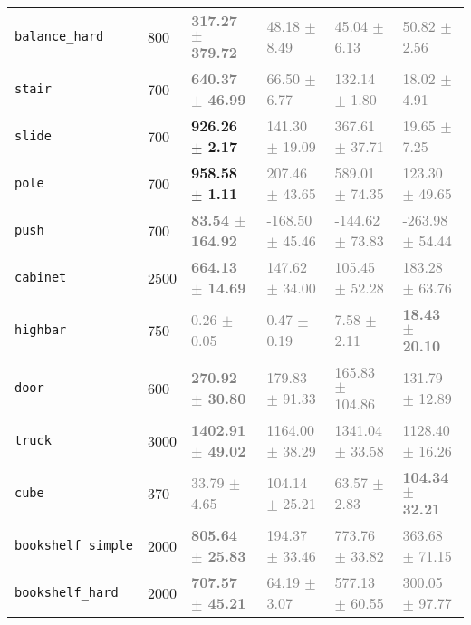\begin{table}[htbp]
\begin{tabular}{l|l|llll}
\texttt{balance\_hard} & 800 & \textbf{\textcolor{gray}{317.27 $\pm$ 379.72}} & \textcolor{gray}{48.18 $\pm$ 8.49} & \textcolor{gray}{45.04 $\pm$ 6.13} & \textcolor{gray}{50.82 $\pm$ 2.56} \\ 
\texttt{stair} & 700 & \textbf{\textcolor{gray}{640.37 $\pm$ 46.99}} & \textcolor{gray}{66.50 $\pm$ 6.77} & \textcolor{gray}{132.14 $\pm$ 1.80} & \textcolor{gray}{18.02 $\pm$ 4.91} \\ 
\texttt{slide} & 700 & \textbf{926.26 $\pm$ 2.17} & \textcolor{gray}{141.30 $\pm$ 19.09} & \textcolor{gray}{367.61 $\pm$ 37.71} & \textcolor{gray}{19.65 $\pm$ 7.25} \\ 
\texttt{pole} & 700 & \textbf{958.58 $\pm$ 1.11} & \textcolor{gray}{207.46 $\pm$ 43.65} & \textcolor{gray}{589.01 $\pm$ 74.35} & \textcolor{gray}{123.30 $\pm$ 49.65} \\ 
\texttt{push} & 700 & \textbf{\textcolor{gray}{83.54 $\pm$ 164.92}} & \textcolor{gray}{-168.50 $\pm$ 45.46} & \textcolor{gray}{-144.62 $\pm$ 73.83} & \textcolor{gray}{-263.98 $\pm$ 54.44} \\ 
\texttt{cabinet} & 2500 & \textbf{\textcolor{gray}{664.13 $\pm$ 14.69}} & \textcolor{gray}{147.62 $\pm$ 34.00} & \textcolor{gray}{105.45 $\pm$ 52.28} & \textcolor{gray}{183.28 $\pm$ 63.76} \\ 
\texttt{highbar} & 750 & \textcolor{gray}{0.26 $\pm$ 0.05} & \textcolor{gray}{0.47 $\pm$ 0.19} & \textcolor{gray}{7.58 $\pm$ 2.11} & \textbf{\textcolor{gray}{18.43 $\pm$ 20.10}} \\ 
\texttt{door} & 600 & \textbf{\textcolor{gray}{270.92 $\pm$ 30.80}} & \textcolor{gray}{179.83 $\pm$ 91.33} & \textcolor{gray}{165.83 $\pm$ 104.86} & \textcolor{gray}{131.79 $\pm$ 12.89} \\ 
\texttt{truck} & 3000 & \textbf{\textcolor{gray}{1402.91 $\pm$ 49.02}} & \textcolor{gray}{1164.00 $\pm$ 38.29} & \textcolor{gray}{1341.04 $\pm$ 33.58} & \textcolor{gray}{1128.40 $\pm$ 16.26} \\ 
\texttt{cube} & 370 & \textcolor{gray}{33.79 $\pm$ 4.65} & \textcolor{gray}{104.14 $\pm$ 25.21} & \textcolor{gray}{63.57 $\pm$ 2.83} & \textbf{\textcolor{gray}{104.34 $\pm$ 32.21}} \\ 
\texttt{bookshelf\_simple} & 2000 & \textbf{\textcolor{gray}{805.64 $\pm$ 25.83}} & \textcolor{gray}{194.37 $\pm$ 33.46} & \textcolor{gray}{773.76 $\pm$ 33.82} & \textcolor{gray}{363.68 $\pm$ 71.15} \\ 
\texttt{bookshelf\_hard} & 2000 & \textbf{\textcolor{gray}{707.57 $\pm$ 45.21}} & \textcolor{gray}{64.19 $\pm$ 3.07} & \textcolor{gray}{577.13 $\pm$ 60.55} & \textcolor{gray}{300.05 $\pm$ 97.77} \\ 

\end{tabular}
\end{table}
